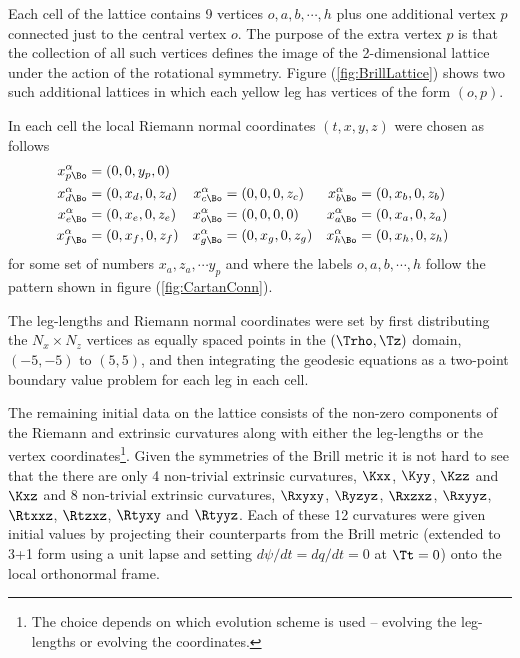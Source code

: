 \documentclass[a4paper,12pt]{article}
\numberwithin{equation}{section}
\begin{document}
Each cell of the lattice contains 9 vertices $o,a,b,\cdots,h$ plus one additional vertex $p$
connected just to the central vertex $o$. The purpose of the extra vertex $p$ is that the
collection of all such vertices defines the image of the 2-dimensional lattice under the
action of the rotational symmetry. Figure (\ref{fig:BrillLattice}) shows two such additional
lattices in which each yellow leg has vertices of the form $(o,p)$.

In each cell the local Riemann normal coordinates $(t,x,y,z)$ were chosen as follows
\begin{align}
   x^\alpha_{p\Bo} &= (0,0,y_p,0)\\
   x^\alpha_{d\Bo} &= (0,x_d,0,z_d)&
   x^\alpha_{c\Bo} &= (0,0,0,z_c)&
   x^\alpha_{b\Bo} &= (0,x_b,0,z_b)\\
   x^\alpha_{e\Bo} &= (0,x_e,0,z_e)&
   x^\alpha_{o\Bo} &= (0,0,0,0)&
   x^\alpha_{a\Bo} &= (0,x_a,0,z_a)\\
   x^\alpha_{f\Bo} &= (0,x_f,0,z_f)&
   x^\alpha_{g\Bo} &= (0,x_g,0,z_g)&
   x^\alpha_{h\Bo} &= (0,x_h,0,z_h)
\end{align}
for some set of numbers $x_a,z_a,\cdots y_p$ and where the labels $o,a,b,\cdots,h$
follow the pattern shown in figure (\ref{fig:CartanConn}).

The leg-lengths and Riemann normal coordinates were set by first distributing the $N_x\times
N_z$ vertices as equally spaced points in the $(\Trho,\Tz)$ domain, $(-5,-5)$ to $(5,5)$, and
then integrating the geodesic equations as a two-point boundary value problem for each leg in
each cell.

The remaining initial data on the lattice consists of the non-zero components of the Riemann
and extrinsic curvatures along with either the leg-lengths or the vertex
coordinates\footnote{The choice depends on which evolution scheme is used -- evolving the
leg-lengths or evolving the coordinates.}. Given the symmetries of the Brill metric it is
not hard to see that the there are only 4 non-trivial extrinsic curvatures, $\Kxx$, $\Kyy$,
$\Kzz$ and $\Kxz$ and 8 non-trivial extrinsic curvatures, $\Rxyxy$, $\Ryzyz$, $\Rxzxz$,
$\Rxyyz$, $\Rtxxz$, $\Rtzxz$, $\Rtyxy$ and $\Rtyyz$. Each of these 12 curvatures were given
initial values by projecting their counterparts from the Brill metric (extended to 3+1 form
using a unit lapse and setting $d\psi/dt=dq/dt=0$ at $\Tt=0$) onto the local orthonormal
frame.

\end{document}
